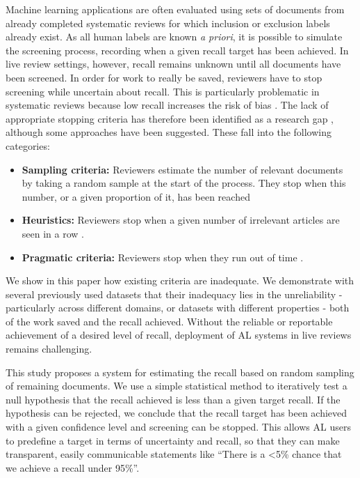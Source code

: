 \documentclass{bmcart}
\begin{document}
	Machine learning applications are often evaluated using sets of documents from already completed systematic reviews for which inclusion or exclusion labels already exist. 
	As all human labels are known \textit{a priori}, it is possible to simulate the screening process, recording when a given recall target has been achieved.
	In live review settings, however, recall remains unknown until all documents have been screened. 
	In order for work to really be saved, reviewers have to stop screening while uncertain about recall. 
	This is particularly problematic in systematic reviews because low recall increases the risk of bias \cite{Lefebvre2011}.
	The lack of appropriate stopping criteria has therefore been identified as a research gap \cite{bannach-brown2019, Marshall2019}, although some approaches have been suggested. These fall into the following categories:
	\begin{itemize}
		\item \textbf{Sampling criteria:} Reviewers estimate the number of relevant documents by taking a random sample at the start of the process. They stop when this number, or a given proportion of it, has been reached \cite{Shemilt2014}
		\item \textbf{Heuristics:} Reviewers stop when a given number of irrelevant articles are seen in a row \cite{Jonnalagadda2013, Przybya2018}. 
		\item \textbf{Pragmatic criteria:} Reviewers stop when they run out of time \cite{miwa2014}. 
	\end{itemize}
	
	We show in this paper how existing criteria are inadequate.
	We demonstrate with several previously used datasets that their inadequacy lies in the unreliability - particularly across different domains, or datasets with different properties \cite{OMara-Eves2015} - both of the work saved and the recall achieved.  
	Without the reliable or reportable achievement of a desired level of recall, deployment of AL systems in live reviews remains challenging.
	
	This study proposes a system for estimating the recall based on random sampling of remaining documents. 
	We use a simple statistical method to iteratively test a null hypothesis that the recall achieved is less than a given target recall. If the hypothesis can be rejected, we conclude that the recall target has been achieved with a given confidence level and screening can be stopped.
	This allows AL users to predefine a target in terms of uncertainty and recall, so that they can make transparent, easily communicable statements like ``There is a <5\% chance that we achieve a recall under 95\%''.
	
\end{document}
